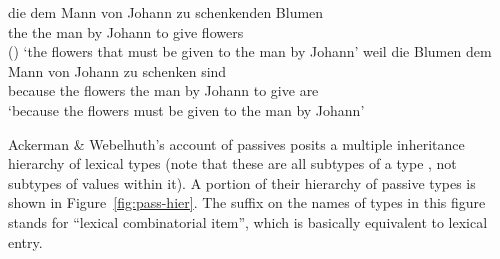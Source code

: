 \documentclass[output=paper,biblatex,babelshorthands,newtxmath,draftmode,colorlinks,citecolor=brown]{langscibook}
\begin{document}
\begin{exe}
	\ex\label{zu-pass}
	\begin{xlist}
		\ex\label{zu-pass-a}
		\gll die dem Mann von Johann zu schenkenden Blumen \\
		the the man by Johann to give flowers  \\\hfill()
		\glt `the flowers that must be given to the man by Johann'
		\ex\label{zu-pass-b}
		\gll weil die Blumen dem Mann von Johann zu schenken sind \\
		because the flowers the man by Johann to give are \\
		\glt `because the flowers must be given to the man by Johann'
	\end{xlist}
\end{exe}

\noindent
Ackerman \& Webelhuth's account of  passives posits a multiple inheritance hierarchy of lexical types (note that these are all subtypes of a type , not subtypes of values within it). A portion of their hierarchy of  passive types is shown in Figure~\ref{fig:pass-hier}.
The suffix  on the names of types in this figure stands for ``lexical combinatorial item'', which is basically equivalent to lexical entry.
\end{document}
